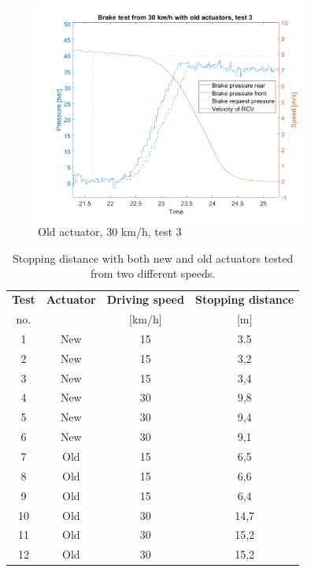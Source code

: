 \documentclass[a4paper,11pt]{kth-mag}
\begin{document}
\begin{figure}[h]
\centering
\includegraphics[width=0.8\textwidth]{Old_30kph_test3}
\caption{Old actuator, 30 km/h, test 3}
\label{fig:Old_30kph_test3}
\end{figure}

\begin{table}[hp]
  \begin{center}
    \caption{Stopping distance with both new and old actuators tested from two different speeds.}
    \label{tab:table1}
    \begin{tabular}{  c | c | c | c } %
      \textbf{Test} & \textbf{Actuator} & \textbf{Driving speed}& \textbf{Stopping distance}\\
      no. &   & [km/h] & [m] \\
      \hline
      1 & New & 15 & 3.5 \\
      2 & New & 15 & 3,2 \\
      3 & New & 15 & 3,4 \\
      \hline
      4 & New & 30 & 9,8 \\
      5 & New & 30 & 9,4 \\
      6 & New & 30 & 9,1 \\
      \hline
      7 & Old & 15 & 6,5 \\
      8 & Old & 15 & 6,6 \\
      9 & Old & 15 & 6,4 \\
      \hline
      10 & Old & 30 & 14,7 \\
      11 & Old & 30 & 15,2 \\
      12 & Old & 30 & 15,2 \\
      
    \end{tabular}
  \end{center}
\end{table}
\end{document}
